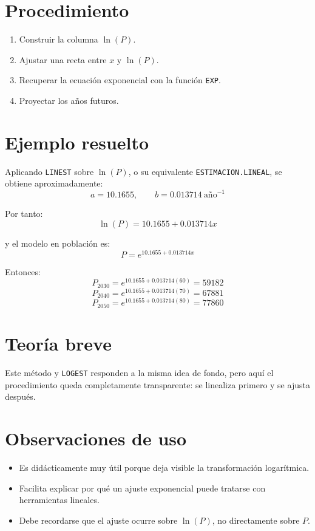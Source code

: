 \documentclass[12pt]{article}
\begin{document}
\section{Procedimiento}
\begin{enumerate}
\item Construir la columna $\ln(P)$.
\item Ajustar una recta entre $x$ y $\ln(P)$.
\item Recuperar la ecuación exponencial con la función \texttt{EXP}.
\item Proyectar los años futuros.
\end{enumerate}

\section{Ejemplo resuelto}
Aplicando \texttt{LINEST} sobre $\ln(P)$, o su equivalente \texttt{ESTIMACION.LINEAL}, se obtiene aproximadamente:
\[
a=10.1655,\qquad b=0.013714\ \text{año}^{-1}
\]

Por tanto:
\[
\ln(P)=10.1655+0.013714x
\]

y el modelo en población es:
\[
P=e^{10.1655+0.013714x}
\]

Entonces:
\[
P_{2030}=e^{10.1655+0.013714(60)}=\num{59182}
\]
\[
P_{2040}=e^{10.1655+0.013714(70)}=\num{67881}
\]
\[
P_{2050}=e^{10.1655+0.013714(80)}=\num{77860}
\]


\section{Teoría breve}
Este método y \texttt{LOGEST} responden a la misma idea de fondo, pero aquí el procedimiento queda completamente transparente: se linealiza primero y se ajusta después.

\section{Observaciones de uso}
\begin{itemize}
\item Es didácticamente muy útil porque deja visible la transformación logarítmica.
\item Facilita explicar por qué un ajuste exponencial puede tratarse con herramientas lineales.
\item Debe recordarse que el ajuste ocurre sobre $\ln(P)$, no directamente sobre $P$.
\end{itemize}
\end{document}
